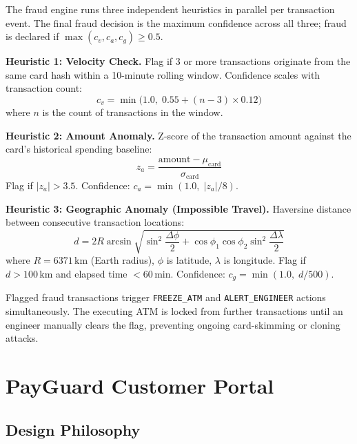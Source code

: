 \documentclass[11pt,a4paper]{article}
\begin{document}
The fraud engine runs three independent heuristics in parallel per transaction event. The final fraud decision is the maximum confidence across all three; fraud is declared if $\max(c_v, c_a, c_g) \geq 0.5$.

\textbf{Heuristic 1: Velocity Check.} Flag if 3 or more transactions originate from the same card hash within a 10-minute rolling window. Confidence scales with transaction count:
\begin{equation}
  c_v = \min\!\bigl(1.0,\; 0.55 + (n - 3) \times 0.12\bigr)
\end{equation}
where $n$ is the count of transactions in the window.

\textbf{Heuristic 2: Amount Anomaly.} Z-score of the transaction amount against the card's historical spending baseline:
\begin{equation}
  z_a = \frac{\text{amount} - \mu_{\text{card}}}{\sigma_{\text{card}}}
\end{equation}
Flag if $|z_a| > 3.5$. Confidence: $c_a = \min(1.0,\; |z_a| / 8)$.

\textbf{Heuristic 3: Geographic Anomaly (Impossible Travel).} Haversine distance between consecutive transaction locations:
\begin{equation}
  d = 2R \arcsin\!\sqrt{\sin^2\!\frac{\Delta\phi}{2} + \cos\phi_1 \cos\phi_2 \sin^2\!\frac{\Delta\lambda}{2}}
\end{equation}
where $R = 6371\,\text{km}$ (Earth radius), $\phi$ is latitude, $\lambda$ is longitude. Flag if $d > 100\,\text{km}$ and elapsed time $< 60\,\text{min}$. Confidence: $c_g = \min(1.0,\; d/500)$.

Flagged fraud transactions trigger \texttt{FREEZE\_ATM} and \texttt{ALERT\_ENGINEER} actions simultaneously. The executing ATM is locked from further transactions until an engineer manually clears the flag, preventing ongoing card-skimming or cloning attacks.

\section{PayGuard Customer Portal}

\subsection{Design Philosophy}
\end{document}
